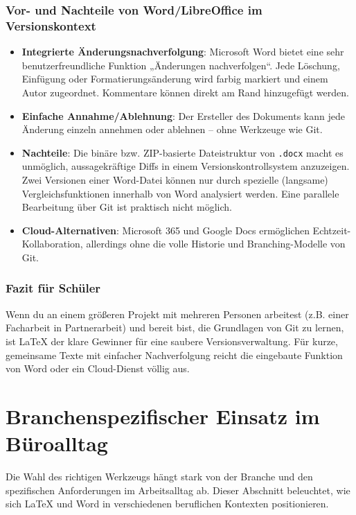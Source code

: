 \documentclass[a4paper,12pt]{article}
\begin{document}
	\subsubsection{Vor- und Nachteile von Word/LibreOffice im Versionskontext}
	\begin{itemize}
		\item \textbf{Integrierte Änderungsnachverfolgung}: Microsoft Word bietet eine sehr benutzerfreundliche Funktion „Änderungen nachverfolgen“. Jede Löschung, Einfügung oder Formatierungsänderung wird farbig markiert und einem Autor zugeordnet. Kommentare können direkt am Rand hinzugefügt werden.
		\item \textbf{Einfache Annahme/Ablehnung}: Der Ersteller des Dokuments kann jede Änderung einzeln annehmen oder ablehnen – ohne Werkzeuge wie Git.
		\item \textbf{Nachteile}: Die binäre bzw. ZIP-basierte Dateistruktur von \texttt{.docx} macht es unmöglich, aussagekräftige Diffs in einem Versionskontrollsystem anzuzeigen. Zwei Versionen einer Word-Datei können nur durch spezielle (langsame) Vergleichsfunktionen innerhalb von Word analysiert werden. Eine parallele Bearbeitung über Git ist praktisch nicht möglich.
		\item \textbf{Cloud-Alternativen}: Microsoft 365 und Google Docs ermöglichen Echtzeit-Kollaboration, allerdings ohne die volle Historie und Branching-Modelle von Git.
	\end{itemize}
	
	\subsubsection{Fazit für Schüler}
	Wenn du an einem größeren Projekt mit mehreren Personen arbeitest (z.B. einer Facharbeit in Partnerarbeit) und bereit bist, die Grundlagen von Git zu lernen, ist \LaTeX{} der klare Gewinner für eine saubere Versionsverwaltung. Für kurze, gemeinsame Texte mit einfacher Nachverfolgung reicht die eingebaute Funktion von Word oder ein Cloud-Dienst völlig aus.
	
	\section{Branchenspezifischer Einsatz im Büroalltag}
	\label{sec:branchen}
	
	Die Wahl des richtigen Werkzeugs hängt stark von der Branche und den spezifischen Anforderungen im Arbeitsalltag ab. Dieser Abschnitt beleuchtet, wie sich \LaTeX{} und Word in verschiedenen beruflichen Kontexten positionieren.
	
\end{document}
